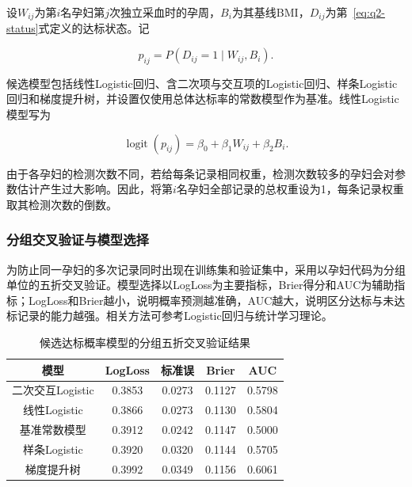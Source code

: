 设$W_{ij}$为第$i$名孕妇第$j$次独立采血时的孕周，$B_i$为其基线BMI，$D_{ij}$为第~\ref{eq:q2-status}式定义的达标状态。记

\begin{equation}
  p_{ij}=P\!\left(D_{ij}=1\mid W_{ij},B_i\right).
  \label{eq:q2-probability}
\end{equation}

候选模型包括线性Logistic回归、含二次项与交互项的Logistic回归、样条Logistic回归和梯度提升树，并设置仅使用总体达标率的常数模型作为基准。线性Logistic模型写为

\begin{equation}
  \operatorname{logit}(p_{ij})
  =\beta_0+\beta_1W_{ij}+\beta_2B_i.
  \label{eq:q2-logistic}
\end{equation}

由于各孕妇的检测次数不同，若给每条记录相同权重，检测次数较多的孕妇会对参数估计产生过大影响。因此，将第$i$名孕妇全部记录的总权重设为1，每条记录权重取其检测次数的倒数。

\subsubsection{分组交叉验证与模型选择}

为防止同一孕妇的多次记录同时出现在训练集和验证集中，采用以孕妇代码为分组单位的五折交叉验证。模型选择以LogLoss为主要指标，Brier得分和AUC为辅助指标；LogLoss和Brier越小，说明概率预测越准确，AUC越大，说明区分达标与未达标记录的能力越强。相关方法可参考Logistic回归与统计学习理论\cite{hosmer2013applied,hastie2009elements}。

\begin{table}[H]
  \centering
  \caption{候选达标概率模型的分组五折交叉验证结果}
  \label{tab:q2-model-cv}
  \begin{tabular}{ccccc}
    \toprule
    模型 & LogLoss & 标准误 & Brier & AUC \\
    \midrule
    二次交互Logistic & 0.3853 & 0.0273 & 0.1127 & 0.5798 \\
    线性Logistic & 0.3866 & 0.0273 & 0.1130 & 0.5804 \\
    基准常数模型 & 0.3912 & 0.0242 & 0.1147 & 0.5000 \\
    样条Logistic & 0.3920 & 0.0320 & 0.1144 & 0.5705 \\
    梯度提升树 & 0.3992 & 0.0349 & 0.1156 & 0.6061 \\
    \bottomrule
  \end{tabular}
\end{table}

